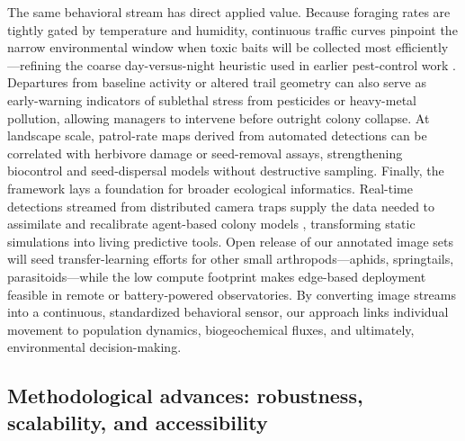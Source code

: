 The same behavioral stream has direct applied value. Because foraging rates are tightly gated by temperature and humidity, continuous traffic curves pinpoint the narrow environmental window when toxic baits will be collected most efficiently—refining the coarse day-versus-night heuristic used in earlier pest-control work \citep{vogt_timing_2005}. Departures from baseline activity or altered trail geometry can also serve as early-warning indicators of sublethal stress from pesticides or heavy-metal pollution, allowing managers to intervene before outright colony collapse. At landscape scale, patrol-rate maps derived from automated detections can be correlated with herbivore damage or seed-removal assays, strengthening biocontrol and seed-dispersal models without destructive sampling. Finally, the framework lays a foundation for broader ecological informatics. Real-time detections streamed from distributed camera traps supply the data needed to assimilate and recalibrate agent-based colony models \citep{li_chaosorder_2014}, transforming static simulations into living predictive tools. Open release of our annotated image sets will seed transfer-learning efforts for other small arthropods—aphids, springtails, parasitoids—while the low compute footprint makes edge-based deployment feasible in remote or battery-powered observatories. By converting image streams into a continuous, standardized behavioral sensor, our approach links individual movement to population dynamics, biogeochemical fluxes, and ultimately, environmental decision-making.

\subsection{Methodological advances: robustness, scalability, and accessibility}


